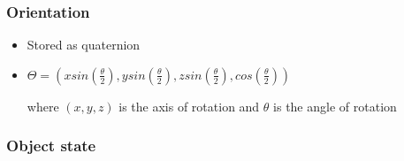 \documentclass[a4paper]{article}
\begin{document}
\subsubsection{Orientation}

\begin{itemize}
  \item
    Stored as quaternion

  \item
    $\Theta = \left(
      xsin\left(\frac{\theta}{2}\right),
      ysin\left(\frac{\theta}{2}\right),
      zsin\left(\frac{\theta}{2}\right),
      cos\left(\frac{\theta}{2}\right)
    \right)$

    where $(x, y, z)$ is the axis of rotation and $\theta$ is the angle of
    rotation

\end{itemize}

\subsubsection{Object state}
\end{document}
